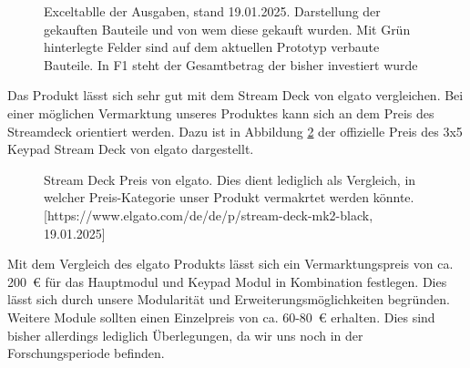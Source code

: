 \begin{figure}[H]
	\centering    
	\caption{Exceltablle der Ausgaben, stand 19.01.2025. Darstellung der gekauften Bauteile und von wem diese gekauft wurden. Mit Grün hinterlegte Felder sind auf dem aktuellen Prototyp verbaute Bauteile. In F1 steht der Gesamtbetrag der bisher investiert wurde}
	\label{Finanzen}
\end{figure}

Das Produkt lässt sich sehr gut mit dem Stream Deck von elgato vergleichen. Bei einer möglichen Vermarktung unseres Produktes kann sich an dem Preis des Streamdeck orientiert werden. Dazu ist in Abbildung \ref{streamDeck} der offizielle Preis des 3x5 Keypad Stream Deck von elgato dargestellt.

\begin{figure}[H]
	\centering    
	\caption{Stream Deck Preis von elgato. Dies dient lediglich als Vergleich, in welcher Preis-Kategorie unser Produkt vermakrtet werden könnte. [https://www.elgato.com/de/de/p/stream-deck-mk2-black, 19.01.2025]}
	\label{streamDeck}
\end{figure}

Mit dem Vergleich des elgato Produkts lässt sich ein Vermarktungspreis von ca. 200 € für das Hauptmodul und Keypad Modul in Kombination festlegen. Dies lässt sich durch unsere Modularität und Erweiterungsmöglichkeiten begründen. Weitere Module sollten einen Einzelpreis von ca. 60-80 € erhalten.
Dies sind bisher allerdings lediglich Überlegungen, da wir uns noch in der Forschungsperiode befinden.

